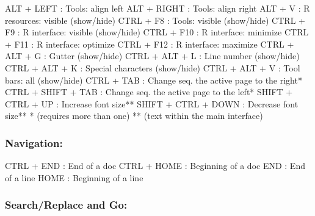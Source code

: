 \vspace{-0.5cm}
\begin{Rtables}[caption={[Visualization keyboard shortcuts]
    Visualization keyboard shortcuts},
  label=hotkey:visualization]
  ALT   + LEFT            : Tools: align left
  ALT   + RIGHT           : Tools: align right
  ALT   + V               : R resources: visible (show/hide)
  CTRL  + F8              : Tools: visible (show/hide)
  CTRL  + F9              : R interface: visible (show/hide)
  CTRL  + F10             : R interface: minimize
  CTRL  + F11             : R interface: optimize
  CTRL  + F12             : R interface: maximize
  CTRL  + ALT  + G        : Gutter (show/hide)
  CTRL  + ALT  + L        : Line number (show/hide)
  CTRL  + ALT  + K        : Special characters (show/hide)
  CTRL  + ALT  + V        : Tool bars: all (show/hide)
  CTRL  + TAB             : Change seq. the active page to the right*
  CTRL  + SHIFT + TAB     : Change seq. the active page to the left*
  SHIFT + CTRL + UP       : Increase font size**
  SHIFT + CTRL + DOWN     : Decrease font size**
  *  (requires more than one)
  ** (text within the main interface)
\end{Rtables}


\subsubsection{Navigation:}

\vspace{-0.5cm}
\begin{Rtables}[caption={[Navigation keyboard shortcuts]
    Navigation keyboard shortcuts},
  label=hotkey:navigation]
  CTRL  + END             : End of a doc
  CTRL  + HOME            : Beginning of a doc
  END                     : End of a line
  HOME                    : Beginning of a line
\end{Rtables}


\newpage
\subsubsection{Search/Replace and Go:}

